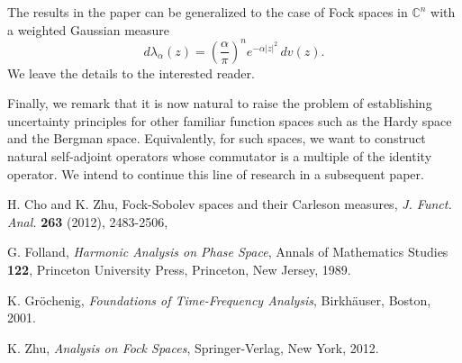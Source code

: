\documentclass[12pt,reqno]{amsart}
\begin{document}
The results in the paper can be generalized to the case of Fock spaces in ${{\mathbb C}^n}$ with a weighted Gaussian measure
$$d\lambda_\alpha(z)=\left(\frac\alpha\pi\right)^n e^{-\alpha|z|^2}\,dv(z).$$
We leave the details to the interested reader.

Finally, we remark that it is now natural to raise the problem of establishing uncertainty principles for other familiar 
function spaces such as the Hardy space and the Bergman space. Equivalently, for such spaces, we want to
construct natural self-adjoint operators whose commutator is a multiple of the identity operator. We intend to
continue this line of research in a subsequent paper.

\begin{thebibliography}{99}

 H. Cho and K. Zhu, Fock-Sobolev spaces and their Carleson measures, {\it J. Funct. Anal.} {\bf 263} (2012), 2483-2506, 

 G. Folland, {\it Harmonic Analysis on Phase Space}, Annals of Mathematics Studies {\bf 122}, Princeton University
Press, Princeton, New Jersey, 1989.

 K. Gr\"ochenig, {\it Foundations of Time-Frequency Analysis}, Birkh\"auser, Boston, 2001. 

 K. Zhu, {\it Analysis on Fock Spaces}, Springer-Verlag, New York, 2012.

\end{thebibliography}
\end{document}
